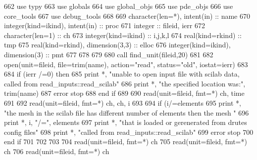 \begin{DoxyCode}
662       \textcolor{keywordtype}{use }typy
663       \textcolor{keywordtype}{use }globals
664       \textcolor{keywordtype}{use }global_objs
665       \textcolor{keywordtype}{use }pde_objs
666       \textcolor{keywordtype}{use }core_tools
667       \textcolor{keywordtype}{use }debug_tools
668       
669       \textcolor{keywordtype}{character(len=*)}, \textcolor{keywordtype}{intent(in)}  :: name
670       \textcolor{keywordtype}{integer(kind=ikind)}, \textcolor{keywordtype}{intent(in)} :: proc
671       \textcolor{keywordtype}{integer} :: fileid, ierr
672       \textcolor{keywordtype}{character(len=1)} :: ch
673       \textcolor{keywordtype}{integer(kind=ikind)} :: i,j,k,l
674       \textcolor{keywordtype}{real(kind=rkind)} :: tmp
675       \textcolor{keywordtype}{real(kind=rkind)}, \textcolor{keywordtype}{dimension(3,3)} :: elloc
676       \textcolor{keywordtype}{integer(kind=ikind)}, \textcolor{keywordtype}{dimension(3)} :: pmt
677       
678 
679 
680       \textcolor{keyword}{call }find_unit(fileid,20)
681       
682       \textcolor{keyword}{open}(unit=fileid, file=trim(name), action=\textcolor{stringliteral}{"read"}, status=\textcolor{stringliteral}{"old"}, iostat\textcolor{comment}{=ierr)}
683 \textcolor{comment}{      }
684 \textcolor{comment}{      }\textcolor{keywordflow}{if} (ierr /=0) \textcolor{keywordflow}{then}
685         print *, \textcolor{stringliteral}{"unable to open input file with scilab data, called from read\_inputs::read\_scilab"}
686         print *, \textcolor{stringliteral}{"the specified location was:"}, trim(name)
687         error stop
688 \textcolor{keywordflow}{      end if}
689       
690       \textcolor{keyword}{read}(unit=fileid, fmt=*) ch, time
691       
692       \textcolor{keyword}{read}(unit=fileid, fmt=*) ch, ch, i
693       
694       \textcolor{keywordflow}{if} (i/=elements%
695         print *, \textcolor{stringliteral}{"the mesh in the scilab file has different number of elements then the mesh "}
696         print *, i, \textcolor{stringliteral}{"/="}, elements%
697         print *, \textcolor{stringliteral}{"that is loaded or gerenerated from drutes config files"}
698         print *, \textcolor{stringliteral}{"called from read\_inputs::read\_scilab"}
699         error stop
700 \textcolor{keywordflow}{      end if}
701       
702 
703       
704       \textcolor{keyword}{read}(unit=fileid, fmt=*) ch
705       \textcolor{keyword}{read}(unit=fileid, fmt=*) ch
706       \textcolor{keyword}{read}(unit=fileid, fmt=*) ch

\end{DoxyCode}

